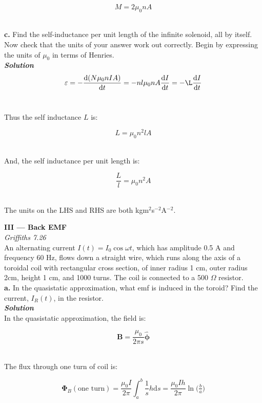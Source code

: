 \documentclass[9pt]{extarticle}
\renewcommand{\v}[1]{{\bm #1}}
\newcommand{\hv}[1]{\hat{\bm{#1}}}
\newcommand{\bfit}[1]{\textbf{\textit{#1}}}
\renewcommand{\d}{\text{d}}
\newcommand{\ddt}[1]{\frac{\d #1}{\d t}}
\newcommand{\muo}{\mu_0}
\begin{document}
\begin{multicols*}{2}
$$M = 2\muo nA$$ \ 




\dotfill 

\hfill 

{\Large \bf c.} Find the self-inductance per unit length of the infinite solenoid, all by itself. Now check that the units of your answer work out correctly. Begin by expressing the units of $\muo$ in terms of Henries. \\ 

{\bfit{Solution}} \\ 

$$\varepsilon = -\ddt{(N\muo n IA)} =  -nl \muo  n A \ddt I  = -\L \ddt I$$ \ 

Thus the self inductance $L$ is:

$$L = \muo n^2 lA$$ \ 

And, the self inductance per unit length is:

$$\frac Ll = \muo n^2 A$$ \ 

The units on the LHS and RHS are both kgm$^2$s$^{-2}$A$^{-2}$. \\ 






\hrulefill 

\hfill 

{\LARGE \bf III --- Back EMF} \\ 

{\it Griffiths 7.26} \\ 

An alternating current $I(t) = I_0\cos\omega t$, which  has  amplitude 0.5 A and frequency 60 Hz, flows down a straight wire, which runs along the axis of a toroidal coil with rectangular cross section,  of inner radius 1 cm, outer radius 2cm, height 1 cm, and 1000 turns. The coil is connected to a 500 $\Omega$ resistor. \\ 

{\bf \Large a.} In  the quasistatic approximation, what emf is induced in the toroid? Find the current, $I_R(t)$, in the resistor. \\ 

{\bfit{Solution}} \\ 

In the quasistatic approximation, the field is:

$$\v B = \frac{\muo}{2\pi s} \hv \phi$$ \ 

The flux through one turn of coil is:

$$\v \Phi_B (\text{one turn}) = \frac{\muo I}{2\pi} \int_a^b \frac 1s h \d s = \frac{\muo I h}{2\pi} \ln \big( \tfrac ba \big)$$ \ 


\end{multicols*}
\end{document}
